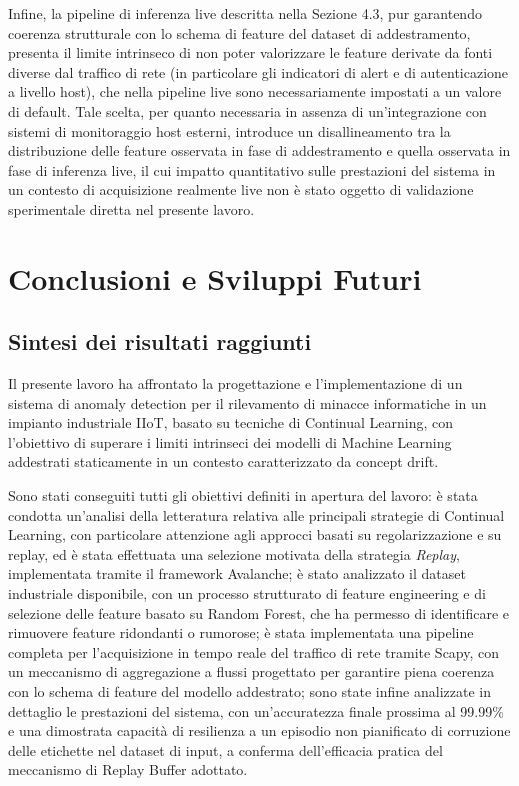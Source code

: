 \documentclass[12pt,a4paper]{report}
\begin{document}
Infine, la pipeline di inferenza live descritta nella Sezione 4.3, pur garantendo coerenza strutturale con lo schema di feature del dataset di addestramento, presenta il limite intrinseco di non poter valorizzare le feature derivate da fonti diverse dal traffico di rete (in particolare gli indicatori di alert e di autenticazione a livello host), che nella pipeline live sono necessariamente impostati a un valore di default. Tale scelta, per quanto necessaria in assenza di un'integrazione con sistemi di monitoraggio host esterni, introduce un disallineamento tra la distribuzione delle feature osservata in fase di addestramento e quella osservata in fase di inferenza live, il cui impatto quantitativo sulle prestazioni del sistema in un contesto di acquisizione realmente live non è stato oggetto di validazione sperimentale diretta nel presente lavoro.

\chapter{Conclusioni e Sviluppi Futuri}

\section{Sintesi dei risultati raggiunti}

Il presente lavoro ha affrontato la progettazione e l'implementazione di un sistema di anomaly detection per il rilevamento di minacce informatiche in un impianto industriale IIoT, basato su tecniche di Continual Learning, con l'obiettivo di superare i limiti intrinseci dei modelli di Machine Learning addestrati staticamente in un contesto caratterizzato da concept drift.

Sono stati conseguiti tutti gli obiettivi definiti in apertura del lavoro: è stata condotta un'analisi della letteratura relativa alle principali strategie di Continual Learning, con particolare attenzione agli approcci basati su regolarizzazione e su replay, ed è stata effettuata una selezione motivata della strategia \emph{Replay}, implementata tramite il framework Avalanche; è stato analizzato il dataset industriale disponibile, con un processo strutturato di feature engineering e di selezione delle feature basato su Random Forest, che ha permesso di identificare e rimuovere feature ridondanti o rumorose; è stata implementata una pipeline completa per l'acquisizione in tempo reale del traffico di rete tramite Scapy, con un meccanismo di aggregazione a flussi progettato per garantire piena coerenza con lo schema di feature del modello addestrato; sono state infine analizzate in dettaglio le prestazioni del sistema, con un'accuratezza finale prossima al 99.99\% e una dimostrata capacità di resilienza a un episodio non pianificato di corruzione delle etichette nel dataset di input, a conferma dell'efficacia pratica del meccanismo di Replay Buffer adottato.
\end{document}
